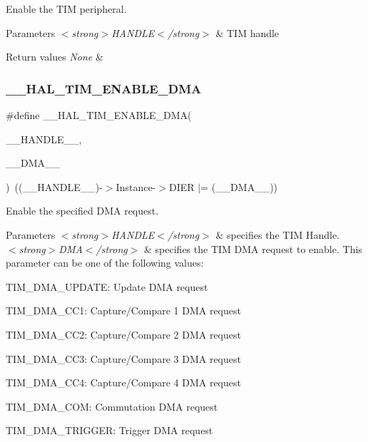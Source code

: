 Enable the T\+IM peripheral. 


\begin{DoxyParams}{Parameters}
{\em $<$strong$>$\+H\+A\+N\+D\+L\+E$<$/strong$>$} & T\+IM handle \\
\hline
\end{DoxyParams}

\begin{DoxyRetVals}{Return values}
{\em None} & \\
\hline
\end{DoxyRetVals}
\mbox{\label{group___t_i_m___exported___macros_gabb91ccd46cd7204c87170a1ea5b38135}} 
\subsubsection{\texorpdfstring{\_\_HAL\_TIM\_ENABLE\_DMA}{\_\_HAL\_TIM\_ENABLE\_DMA}}
{\footnotesize\ttfamily \#define \+\_\+\+\_\+\+H\+A\+L\+\_\+\+T\+I\+M\+\_\+\+E\+N\+A\+B\+L\+E\+\_\+\+D\+MA(\begin{DoxyParamCaption}\item[{}]{\+\_\+\+\_\+\+H\+A\+N\+D\+L\+E\+\_\+\+\_\+,  }\item[{}]{\+\_\+\+\_\+\+D\+M\+A\+\_\+\+\_\+ }\end{DoxyParamCaption})~((\+\_\+\+\_\+\+H\+A\+N\+D\+L\+E\+\_\+\+\_\+)-\/$>$Instance-\/$>$D\+I\+ER $\vert$= (\+\_\+\+\_\+\+D\+M\+A\+\_\+\+\_\+))}



Enable the specified D\+MA request. 


\begin{DoxyParams}{Parameters}
{\em $<$strong$>$\+H\+A\+N\+D\+L\+E$<$/strong$>$} & specifies the T\+IM Handle. \\
\hline
{\em $<$strong$>$\+D\+M\+A$<$/strong$>$} & specifies the T\+IM D\+MA request to enable. This parameter can be one of the following values\+: \begin{DoxyItemize}
\item T\+I\+M\+\_\+\+D\+M\+A\+\_\+\+U\+P\+D\+A\+TE\+: Update D\+MA request \item T\+I\+M\+\_\+\+D\+M\+A\+\_\+\+C\+C1\+: Capture/\+Compare 1 D\+MA request \item T\+I\+M\+\_\+\+D\+M\+A\+\_\+\+C\+C2\+: Capture/\+Compare 2 D\+MA request \item T\+I\+M\+\_\+\+D\+M\+A\+\_\+\+C\+C3\+: Capture/\+Compare 3 D\+MA request \item T\+I\+M\+\_\+\+D\+M\+A\+\_\+\+C\+C4\+: Capture/\+Compare 4 D\+MA request \item T\+I\+M\+\_\+\+D\+M\+A\+\_\+\+C\+OM\+: Commutation D\+MA request \item T\+I\+M\+\_\+\+D\+M\+A\+\_\+\+T\+R\+I\+G\+G\+ER\+: Trigger D\+MA request \end{DoxyItemize}
\\
\hline
\end{DoxyParams}


